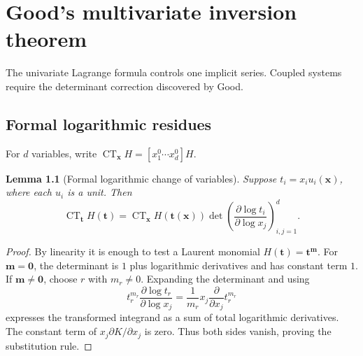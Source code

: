 \documentclass[11pt,a4paper,oneside,openany]{book}
\newtheorem{lemma}[theorem]{Lemma}
\theoremstyle{definition}
\theoremstyle{remark}
\begin{document}
\chapter{Good's multivariate inversion theorem}

The univariate Lagrange formula controls one implicit series. Coupled systems
require the determinant correction discovered by Good.

\section{Formal logarithmic residues}

For $d$ variables, write
$\operatorname{CT}_{\bm x}H=[x_1^0\cdots x_d^0]H$.

\begin{lemma}[Formal logarithmic change of variables]
\label{unif:lem-formal-log-change}
Suppose $t_i=x_i u_i(\bm x)$, where each $u_i$ is a unit. Then
\begin{equation}\label{unif:eq-formal-log-change}
 \operatorname{CT}_{\bm t}H(\bm t)
 =\operatorname{CT}_{\bm x}H(\bm t(\bm x))
 \det\!\left(\frac{\partial\log t_i}{\partial\log x_j}\right)_{i,j=1}^{d}.
\end{equation}
\end{lemma}
\begin{proof}
By linearity it is enough to test a Laurent monomial $H(\bm t)=\bm t^{\bm m}$.
For $\bm m=\bm0$, the determinant is $1$ plus logarithmic derivatives and has
constant term $1$. If $\bm m\ne\bm0$, choose $r$ with $m_r\ne0$. Expanding the
determinant and using
\[
 t_r^{m_r}\frac{\partial\log t_r}{\partial\log x_j}
 =\frac1{m_r}x_j\frac{\partial}{\partial x_j}t_r^{m_r}
\]
expresses the transformed integrand as a sum of total logarithmic derivatives.
The constant term of $x_j\partial K/\partial x_j$ is zero. Thus both sides
vanish, proving the substitution rule.
\end{proof}
\end{document}
